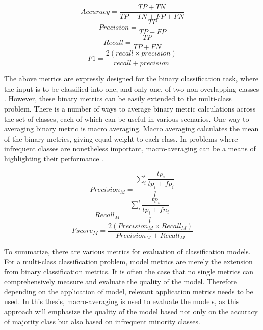 \begin{equation}Accuracy = \dfrac{TP + TN}{TP+TN+FP+FN}\end{equation} 
\begin{equation}Precision = \dfrac{TP}{TP+FP}\end{equation} 
\begin{equation}Recall = \dfrac{TP}{TP+FN}\end{equation} 
\begin{equation}F1 = \dfrac{2 (recall \times precision) }{recall+precision}\end{equation} 

The above metrics are expressly designed for the binary classification task, where the input is to be classified into one, and only one, of two non-overlapping classes \citep{sokolova2009systematic}. However, these binary metrics can be easily extended to the multi-class problem. There is a number of ways to average binary metric calculations across the set of classes, each of which can be useful in various scenarios. One way to averaging binary metric is macro averaging. Macro averaging calculates the mean of the binary metrics, giving equal weight to each class. In problems where infrequent classes are nonetheless important, macro-averaging can be a means of highlighting their performance \citep{scikit-learn}.

\begin{equation}Precision_M =  \dfrac{\sum^l_i\dfrac{tp_i}{tp_i+fp_i}}{l} \end{equation} 
\begin{equation}Recall_M =  \dfrac{\sum^l_i\dfrac{tp_i}{tp_i+fn_i}}{l} \end{equation} 
\begin{equation}Fscore_M =  \dfrac{2 (Precision_M \times Recall_M) }{Precision_M+Recall_M }\end{equation}

To summarize, there are various metrics for evaluation of classification models. For a multi-class classification problem, model metrics are merely the extension from binary classification metrics. It is often the case that no single metrics can comprehensively measure and evaluate the quality of the model. Therefore depending on the application of model, relevant application metrics needs to be used. In this thesis, macro-averaging is used to evaluate the models, as this approach will emphasize the quality of the model based not only on the accuracy of majority class but also based on infrequent minority classes.

